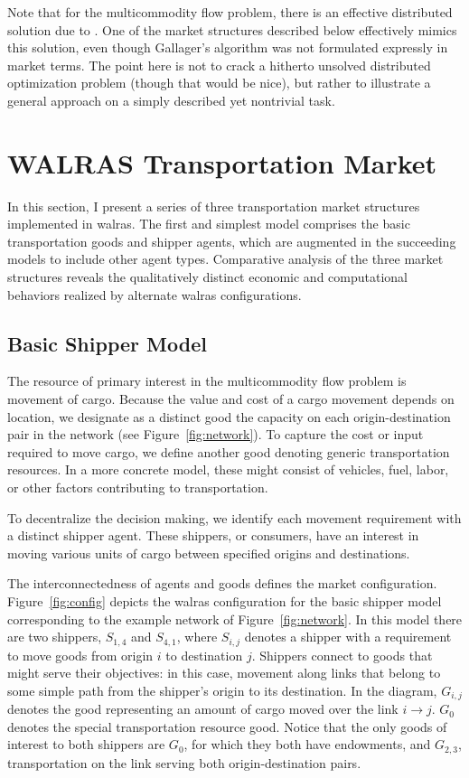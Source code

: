 Note that for the 
multicommodity flow problem, there is an effective distributed solution 
due to .  One of the market structures 
described below effectively mimics this solution, even though Gallager's 
algorithm was not formulated expressly in market terms.  The point here is 
not to crack a hitherto unsolved distributed optimization problem (though 
that would be nice), but rather to illustrate a general approach on a 
simply described yet nontrivial task.

\section{WALRAS Transportation Market}
\label{s-waltrans}

In this section, I present a series of three transportation market
structures implemented in {\sc walras}.  The first and simplest model
comprises the basic transportation goods and shipper agents, which are
augmented in the succeeding models to include other agent types.
Comparative analysis of the three market structures reveals the
qualitatively distinct economic and computational behaviors realized
by alternate {\sc walras} configurations.

\subsection{Basic Shipper Model}

The resource of primary interest in the multicommodity flow problem is
movement of cargo.
Because the value and cost of a cargo movement depends on location, we 
designate as a distinct good the capacity on each origin-destination pair in the
network (see Figure~\ref{fig:network}).
To capture the cost or input required to move cargo, we define another 
good denoting generic transportation resources.
In a more concrete model, these might consist of vehicles, fuel, labor, or
other factors contributing to transportation.

To decentralize the decision making, we identify each movement
requirement with a distinct shipper agent. These shippers, or
consumers, have an interest in moving various 
units of cargo between specified origins and destinations.

The interconnectedness of agents and goods defines the market configuration.
Figure~\ref{fig:config} depicts the {\sc walras} configuration 
for the basic shipper model corresponding to the example network of
Figure~\ref{fig:network}.
In this model there are two shippers, $S_{1,4}$ and $S_{4,1}$, where 
$S_{i,j}$ denotes a shipper with a requirement to move goods from 
origin $i$ to destination $j$.
Shippers connect to goods that might serve their 
objectives: in this case, movement along links that belong to some 
simple path from the shipper's origin to its destination.
In the diagram, $G_{i,j}$ denotes the good representing an amount of
cargo moved over the link $i\rightarrow j$.  $G_0$
denotes the special transportation resource good.  Notice that the
only goods of interest to both shippers are $G_0$, for which they both
have endowments, and $G_{2,3}$, transportation on the link serving
both origin-destination pairs.

